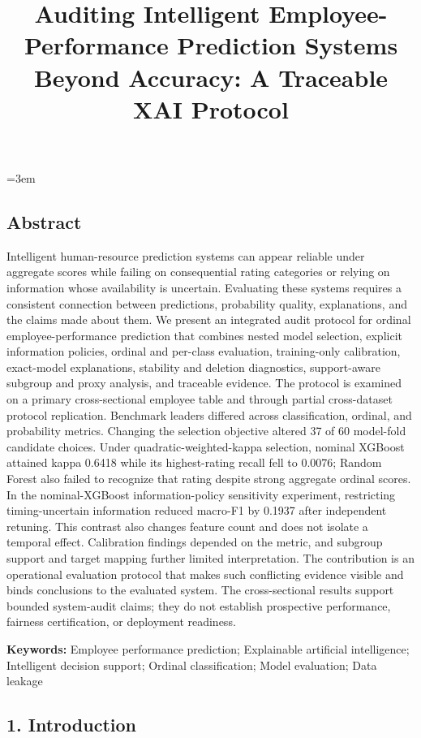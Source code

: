 \documentclass[
  a4paper,
  review]{elsarticle}
\title{Auditing Intelligent Employee-Performance Prediction Systems
Beyond Accuracy: A Traceable XAI Protocol}
\author{}
\date{}
\begin{document}
\emergencystretch=3em
\maketitle

\subsection{Abstract}\label{abstract}

Intelligent human-resource prediction systems can appear reliable under
aggregate scores while failing on consequential rating categories or
relying on information whose availability is uncertain. Evaluating these
systems requires a consistent connection between predictions,
probability quality, explanations, and the claims made about them. We
present an integrated audit protocol for ordinal employee-performance
prediction that combines nested model selection, explicit information
policies, ordinal and per-class evaluation, training-only calibration,
exact-model explanations, stability and deletion diagnostics,
support-aware subgroup and proxy analysis, and traceable evidence. The
protocol is examined on a primary cross-sectional employee table and
through partial cross-dataset protocol replication. Benchmark leaders
differed across classification, ordinal, and probability metrics.
Changing the selection objective altered 37 of 60 model-fold candidate
choices. Under quadratic-weighted-kappa selection, nominal XGBoost
attained kappa 0.6418 while its highest-rating recall fell to 0.0076;
Random Forest also failed to recognize that rating despite strong
aggregate ordinal scores. In the nominal-XGBoost information-policy
sensitivity experiment, restricting timing-uncertain information reduced
macro-F1 by 0.1937 after independent retuning. This contrast also
changes feature count and does not isolate a temporal effect.
Calibration findings depended on the metric, and subgroup support and
target mapping further limited interpretation. The contribution is an
operational evaluation protocol that makes such conflicting evidence
visible and binds conclusions to the evaluated system. The
cross-sectional results support bounded system-audit claims; they do not
establish prospective performance, fairness certification, or deployment
readiness.

\textbf{Keywords:} Employee performance prediction; Explainable
artificial intelligence; Intelligent decision support; Ordinal
classification; Model evaluation; Data leakage

\subsection{1. Introduction}\label{introduction}
\end{document}
